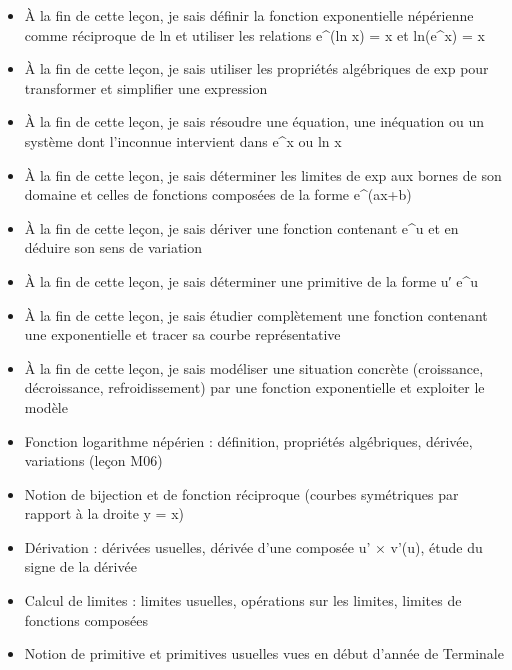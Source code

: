 \documentclass[11pt]{article}
\begin{document}
\begin{objectifs}
\begin{itemize}
\item À la fin de cette leçon, je sais définir la fonction exponentielle népérienne comme réciproque de ln et utiliser les relations e\^{}(ln x) = x et ln(e\^{}x) = x
\item À la fin de cette leçon, je sais utiliser les propriétés algébriques de exp pour transformer et simplifier une expression
\item À la fin de cette leçon, je sais résoudre une équation, une inéquation ou un système dont l'inconnue intervient dans e\^{}x ou ln x
\item À la fin de cette leçon, je sais déterminer les limites de exp aux bornes de son domaine et celles de fonctions composées de la forme e\^{}(ax+b)
\item À la fin de cette leçon, je sais dériver une fonction contenant e\^{}u et en déduire son sens de variation
\item À la fin de cette leçon, je sais déterminer une primitive de la forme u′ e\^{}u
\item À la fin de cette leçon, je sais étudier complètement une fonction contenant une exponentielle et tracer sa courbe représentative
\item À la fin de cette leçon, je sais modéliser une situation concrète (croissance, décroissance, refroidissement) par une fonction exponentielle et exploiter le modèle
\end{itemize}
\end{objectifs}

\begin{prerequis}
\begin{itemize}
\item Fonction logarithme népérien : définition, propriétés algébriques, dérivée, variations (leçon M06)
\item Notion de bijection et de fonction réciproque (courbes symétriques par rapport à la droite y = x)
\item Dérivation : dérivées usuelles, dérivée d'une composée u' × v'(u), étude du signe de la dérivée
\item Calcul de limites : limites usuelles, opérations sur les limites, limites de fonctions composées
\item Notion de primitive et primitives usuelles vues en début d'année de Terminale
\end{itemize}
\end{prerequis}
\end{document}
